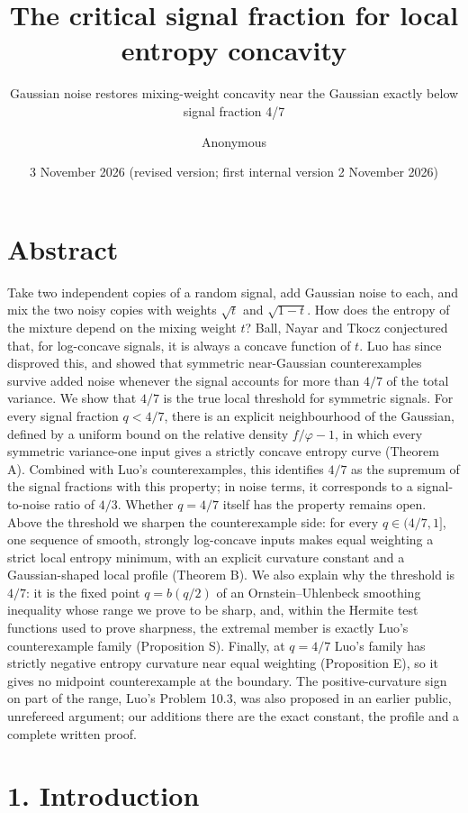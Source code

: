 \documentclass[
  british,
  10pt,
]{article}
\title{The critical signal fraction for local entropy concavity}
\subtitle{Gaussian noise restores mixing-weight concavity near the
Gaussian exactly below signal fraction 4/7}
\author{Anonymous}
\date{3 November 2026 (revised version; first internal version 2
November 2026)}
\begin{document}
\maketitle

{
\setcounter{tocdepth}{2}
\tableofcontents
}
\section{Abstract}\label{abstract}

Take two independent copies of a random signal, add Gaussian noise to
each, and mix the two noisy copies with weights \(\sqrt t\) and
\(\sqrt{1-t}\). How does the entropy of the mixture depend on the mixing
weight \(t\)? Ball, Nayar and Tkocz conjectured that, for log-concave
signals, it is always a concave function of \(t\). Luo has since
disproved this, and showed that symmetric near-Gaussian counterexamples
survive added noise whenever the signal accounts for more than \(4/7\)
of the total variance. We show that \(4/7\) is the true local threshold
for symmetric signals. For every signal fraction \(q<4/7\), there is an
explicit neighbourhood of the Gaussian, defined by a uniform bound on
the relative density \(f/\varphi-1\), in which every symmetric
variance-one input gives a strictly concave entropy curve (Theorem A).
Combined with Luo's counterexamples, this identifies \(4/7\) as the
supremum of the signal fractions with this property; in noise terms, it
corresponds to a signal-to-noise ratio of \(4/3\). Whether \(q=4/7\)
itself has the property remains open. Above the threshold we sharpen the
counterexample side: for every \(q\in(4/7,1]\), one sequence of smooth,
strongly log-concave inputs makes equal weighting a strict local entropy
minimum, with an explicit curvature constant and a Gaussian-shaped local
profile (Theorem B). We also explain why the threshold is \(4/7\): it is
the fixed point \(q=b(q/2)\) of an Ornstein--Uhlenbeck smoothing
inequality whose range we prove to be sharp, and, within the Hermite
test functions used to prove sharpness, the extremal member is exactly
Luo's counterexample family (Proposition S). Finally, at \(q=4/7\) Luo's
family has strictly negative entropy curvature near equal weighting
(Proposition E), so it gives no midpoint counterexample at the boundary.
The positive-curvature sign on part of the range, Luo's Problem 10.3,
was also proposed in an earlier public, unrefereed argument; our
additions there are the exact constant, the profile and a complete
written proof.

\section{1. Introduction}\label{introduction}
\end{document}
